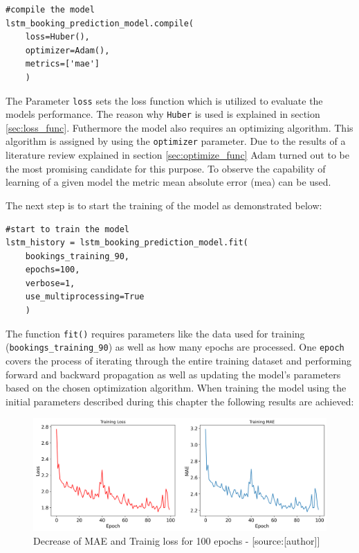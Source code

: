 \begin{lstlisting}
#compile the model 
lstm_booking_prediction_model.compile(
    loss=Huber(),
    optimizer=Adam(),
    metrics=['mae']
	)
\end{lstlisting}
The Parameter \verb|loss| sets the loss function which is utilized to evaluate the models performance. The reason why \verb|Huber| is used is explained in section \ref{sec:loss_func}. Futhermore the model also requires an optimizing algorithm. This algorithm is assigned by using the \verb|optimizer| parameter. Due to the results of a literature review explained in section \ref{sec:optimize_func} Adam turned out to be the most promising candidate for this purpose. To observe the capability of learning of a given model the metric mean absolute error (mea) can be used. 

The next step is to start the training of the model as demonstrated below:
\begin{lstlisting}
#start to train the model
lstm_history = lstm_booking_prediction_model.fit(
    bookings_training_90,
    epochs=100,
    verbose=1,
    use_multiprocessing=True
	)
\end{lstlisting}
The function \verb|fit()| requires parameters like the data used for training (\verb|bookings_training_90|) as well as how many epochs are processed. One \verb|epoch| covers the process of iterating through the entire training dataset and performing forward and backward propagation as well as updating the model's parameters based on the chosen optimization algorithm.
\newline
When training the model using the initial parameters described during this chapter the following results are achieved:
\begin{figure}[H]
	\centering
		\includegraphics[width=14cm]{images/lstm_1_paper_training}
	\caption{Decrease of MAE and Trainig loss for 100 epochs - [source:[author]]}
	\label{fig:training_test}
\end{figure}
